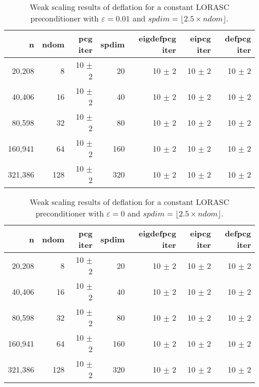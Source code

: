 \documentclass{article}
\begin{document}
\begin{table}[ht]
\caption{Weak scaling results of deflation for a constant LORASC preconditioner with $\varepsilon=0.01$ and $spdim=\lfloor 2.5 \times ndom\rfloor$.}
\centering
\begin{tabular}{|r|r|r|r|r|r|r|}
	\hline
	n & ndom & pcg iter & spdim & eigdefpcg iter & eipcg iter & defpcg iter\\
	\hline
	20,208  &   8 & 10 $\pm$ 2 & 20 & 10 $\pm$ 2 & 10 $\pm$ 2 & 10 $\pm$ 2 \\
	40,406  &  16 & 10 $\pm$ 2 & 40 & 10 $\pm$ 2 & 10 $\pm$ 2 & 10 $\pm$ 2 \\
	80,598  &  32 & 10 $\pm$ 2 & 80 & 10 $\pm$ 2 & 10 $\pm$ 2 & 10 $\pm$ 2 \\
	160,941 &  64 & 10 $\pm$ 2 & 160 & 10 $\pm$ 2 & 10 $\pm$ 2 & 10 $\pm$ 2 \\
	321,386 & 128 & 10 $\pm$ 2 & 320 & 10 $\pm$ 2 & 10 $\pm$ 2 & 10 $\pm$ 2 \\
	\hline
\end{tabular}
\label{Tab:010}
\end{table}

\begin{table}[ht]
	\caption{Weak scaling results of deflation for a constant LORASC preconditioner with $\varepsilon=0$ and $spdim=\lfloor 2.5 \times ndom\rfloor$.}
	\centering
	\begin{tabular}{|r|r|r|r|r|r|r|}
		\hline
		n & ndom & pcg iter & spdim & eigdefpcg iter & eipcg iter & defpcg iter\\
		\hline
		20,208  &   8 & 10 $\pm$ 2 & 20 & 10 $\pm$ 2 & 10 $\pm$ 2 & 10 $\pm$ 2 \\
		40,406  &  16 & 10 $\pm$ 2 & 40 & 10 $\pm$ 2 & 10 $\pm$ 2 & 10 $\pm$ 2 \\
		80,598  &  32 & 10 $\pm$ 2 & 80 & 10 $\pm$ 2 & 10 $\pm$ 2 & 10 $\pm$ 2 \\
		160,941 &  64 & 10 $\pm$ 2 & 160 & 10 $\pm$ 2 & 10 $\pm$ 2 & 10 $\pm$ 2 \\
		321,386 & 128 & 10 $\pm$ 2 & 320 & 10 $\pm$ 2 & 10 $\pm$ 2 & 10 $\pm$ 2 \\
		\hline
	\end{tabular}
	\label{Tab:015}
\end{table}
\end{document}
